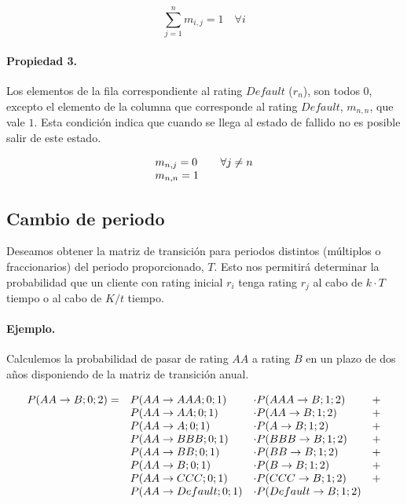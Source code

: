 \begin{displaymath}
\sum_{j=1}^{n} m_{i,j} = 1 \quad \forall i
\end{displaymath}

\paragraph{Propiedad 3.}
Los elementos de la fila correspondiente al rating $Default$ ($r_n$), son todos 
$0$, excepto el elemento de la columna que corresponde al rating $Default$, 
$m_{n,n}$, que vale $1$. Esta condici\'on indica que cuando se llega al estado 
de fallido no es posible salir de este estado.

\begin{displaymath}
\begin{array}{ll}
m_{n,j} = 0        & \quad \forall j \neq n \cr
m_{n,n} = 1
\end{array}
\end{displaymath}


\subsection{Cambio de periodo}

Deseamos obtener la matriz de transici\'on para periodos distintos (m\'ultiplos o 
fraccionarios) del periodo proporcionado, $T$. Esto nos permitir\'a determinar la 
probabilidad que un cliente con rating inicial $r_i$ tenga rating $r_j$ al cabo 
de $k \cdot T$ tiempo o al cabo de $K/t$ tiempo.

\paragraph{Ejemplo.} Calculemos la probabilidad de pasar de rating $AA$ a
rating $B$ en un plazo de dos a\~nos disponiendo de la matriz de transici\'on anual.

\begin{displaymath}
\begin{array}{llll}
P(AA \to B;0;2) = & P(AA \to AAA;0;1)     & \cdot P(AAA \to B;1;2)     & + \cr
                  & P(AA \to AA;0;1)      & \cdot P(AA \to B;1;2)      & + \cr
                  & P(AA \to A;0;1)       & \cdot P(A \to B;1;2)       & + \cr
                  & P(AA \to BBB;0;1)     & \cdot P(BBB \to B;1;2)     & + \cr
                  & P(AA \to BB;0;1)      & \cdot P(BB \to B;1;2)      & + \cr
                  & P(AA \to B;0;1)       & \cdot P(B \to B;1;2)       & + \cr
                  & P(AA \to CCC;0;1)     & \cdot P(CCC \to B;1;2)     & + \cr
                  & P(AA \to Default;0;1) & \cdot P(Default \to B;1;2) &
\end{array}
\end{displaymath}

